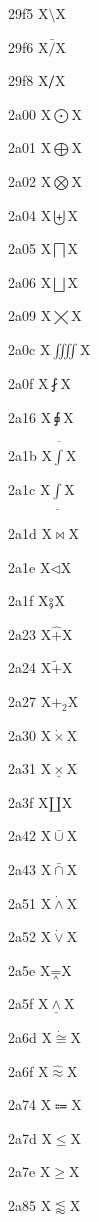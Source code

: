 \documentclass[11pt]{article}
\begin{document}
29f5 X{\ensuremath{\setminus}}X

29f6 X{\ensuremath{\bar{/}}}X

29f8 X{\ensuremath{\big{/}}}X

2a00 X{\ensuremath{\bigodot}}X

2a01 X{\ensuremath{\bigoplus}}X

2a02 X{\ensuremath{\bigotimes}}X

2a04 X{\ensuremath{\biguplus}}X

2a05 X{\ensuremath{\bigsqcap}}X

2a06 X{\ensuremath{\bigsqcup}}X

2a09 X{\ensuremath{\varprod}}X

2a0c X{\ensuremath{\iiiint}}X

2a0f X{\ensuremath{\fint}}X

2a16 X{\ensuremath{\sqint}}X

2a1b X{\ensuremath{\overline{\int}}}X

2a1c X{\ensuremath{\underline{\int}}}X

2a1d X{\ensuremath{\Join}}X

2a1e X{\ensuremath{\lhd}}X

2a1f X{\ensuremath{\fatsemi}}X

2a23 X{\ensuremath{\hat{+}}}X

2a24 X{\ensuremath{\tilde{+}}}X

2a27 X{\ensuremath{+_2}}X

2a30 X{\ensuremath{\dot{\times}}}X

2a31 X{\ensuremath{\underline{\times}}}X

2a3f X{\ensuremath{\amalg}}X

2a42 X{\ensuremath{\bar{\cup}}}X

2a43 X{\ensuremath{\bar{\cap}}}X

2a51 X{\ensuremath{\dot{\wedge}}}X

2a52 X{\ensuremath{\dot{\vee}}}X

2a5e X{\ensuremath{\doublebarwedge}}X

2a5f X{\ensuremath{\underline{\wedge}}}X

2a6d X{\ensuremath{\dot{\cong}}}X

2a6f X{\ensuremath{\hat{\approx}}}X

2a74 X{\ensuremath{\Coloneqq}}X

2a7d X{\ensuremath{\leqslant}}X

2a7e X{\ensuremath{\geqslant}}X

2a85 X{\ensuremath{\lessapprox}}X
\end{document}
